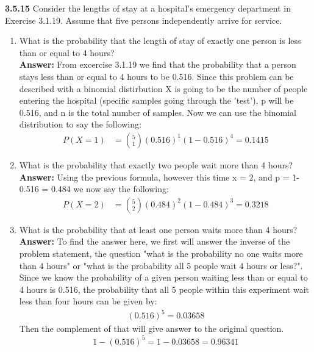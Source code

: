 \documentclass[11pt]{article}
\begin{document}
\textbf{3.5.15} Consider the lengths of stay at a hospital’s emergency department in Exercise 3.1.19. Assume that five persons independently arrive for service.
\begin{enumerate}
\item What is the probability that the length of stay of exactly one person is less than or equal to 4 hours?
\\\textbf{Answer: } From excercise 3.1.19 we find that the probability that a person stays less than or equal to 4 hours to be 0.516. Since this problem can be described with a binomial distirbution X is going to be the number of people entering the hospital (specific samples going through the 'test'), p will be 0.516, and n is the total number of samples. Now we can use the binomial distribution to say the following:
\begin{equation}
\begin{split}
P(X = 1) &= \binom 51 (0.516)^1(1-0.516)^4 = 0.1415
\end{split}
\end{equation}
\item What is the probability that exactly two people wait more than 4 hours?
\\\textbf{Answer: } Using the previous formula, however this time x = 2, and p = 1-0.516 = 0.484 we now say the following:
\begin{equation}
\begin{split}
P(X = 2) &= \binom 52 (0.484)^2(1-0.484)^3 = 0.3218
\end{split}
\end{equation}
\item What is the probability that at least one person waits more than 4 hours? 
\\\textbf{Answer: } To find the answer here, we first will answer the inverse of the problem statement, the question "what is the probability no one waits more than 4 hours" or "what is the probability all 5 people wait 4 hours or less?". Since we know the probability of a given person waiting less than or equal to 4 hours is 0.516, the probability that all 5 people within this experiment wait less than four hours can be given by:
\begin{equation}
\begin{split}
(0.516)^5 = 0.03658
\end{split}
\end{equation}
Then the complement of that will give answer to the original question. 
\begin{equation}
1 - (0.516)^5 = 1 -  0.03658 = 0.96341
\end{equation}
\end{enumerate}
\end{document}

